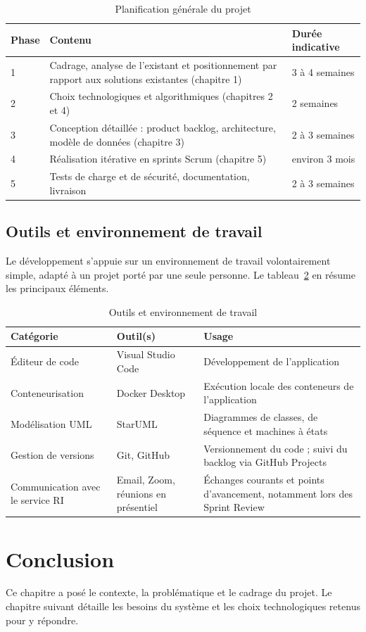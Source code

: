 \renewcommand{\arraystretch}{1.4}
\begin{table}[H]
\centering
\caption{Planification générale du projet}
\label{tab:planning-general}
\footnotesize
\begin{tabular}{|p{1cm}|p{7.5cm}|p{4.5cm}|}
\hline
\rowcolor{gray!20}
\textbf{Phase} & \textbf{Contenu} & \textbf{Durée indicative} \\
\hline
1 & Cadrage, analyse de l'existant et positionnement par rapport aux solutions existantes (chapitre 1) & 3 à 4 semaines \\
\hline
2 & Choix technologiques et algorithmiques (chapitres 2 et 4) & 2 semaines \\
\hline
3 & Conception détaillée : product backlog, architecture, modèle de données (chapitre 3) & 2 à 3 semaines \\
\hline
4 & Réalisation itérative en sprints Scrum (chapitre 5) & environ 3 mois \\
\hline
5 & Tests de charge et de sécurité, documentation, livraison & 2 à 3 semaines \\
\hline
\end{tabular}
\end{table}

\subsection{Outils et environnement de travail}

Le développement s'appuie sur un environnement de travail volontairement simple, adapté à un projet porté par une seule personne. Le tableau~\ref{tab:outils-environnement} en résume les principaux éléments.

\renewcommand{\arraystretch}{1.4}
\begin{table}[H]
\centering
\caption{Outils et environnement de travail}
\label{tab:outils-environnement}
\footnotesize
\begin{tabular}{|p{4cm}|p{4cm}|p{7cm}|}
\hline
\rowcolor{gray!20}
\textbf{Catégorie} & \textbf{Outil(s)} & \textbf{Usage} \\
\hline
Éditeur de code & Visual Studio Code & Développement de l'application \\
\hline
Conteneurisation & Docker Desktop & Exécution locale des conteneurs de l'application \\
\hline
Modélisation UML & StarUML & Diagrammes de classes, de séquence et machines à états \\
\hline
Gestion de versions & Git, GitHub & Versionnement du code ; suivi du backlog via GitHub Projects \\
\hline
Communication avec le service RI & Email, Zoom, réunions en présentiel & Échanges courants et points d'avancement, notamment lors des Sprint Review \\
\hline
\end{tabular}
\end{table}

\section*{Conclusion}
\justifying
{}
{}

Ce chapitre a posé le contexte, la problématique et le cadrage du projet. Le chapitre suivant détaille les besoins du système et les choix technologiques retenus pour y répondre.

